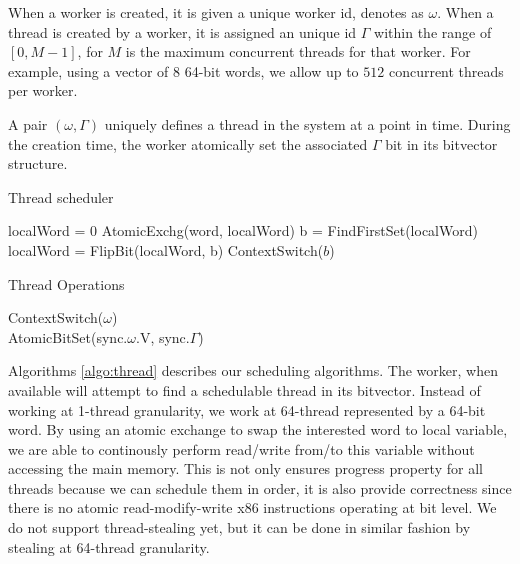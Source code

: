 \documentclass{sig-alternate-05-2015}
\begin{document}
When a worker is created, it is given a unique worker id, denotes as $\omega$.
When a thread is created by a worker, it is assigned an unique id $\Gamma$
within the range of $[0,M-1]$, for $M$ is the maximum concurrent threads for
that worker.  For example, using a vector of $8$ 64-bit words, we allow up to
$512$ concurrent threads per worker.

A pair $(\omega, \Gamma)$ uniquely defines a thread in the system at a point in
time. During the creation time, the worker atomically set the
associated $\Gamma$ bit in its bitvector structure.

\begin{algorithm}
  \caption{Thread scheduler}
  \label{algo:thread}
  \begin{algorithmic}[1]
     
     
        \State localWord = 0
        \State AtomicExchg(word, localWord)
          \State b = FindFirstSet(localWord)
          \State localWord = FlipBit(localWord, b)
          \State ContextSwitch($b$)
        \EndWhile
      \EndIf
      \EndFor
    \EndWhile
    \EndProcedure
  \end{algorithmic}
\end{algorithm}

\begin{algorithm}
  \caption{Thread Operations}
  \label{algo:thread-ops}
  \begin{algorithmic}[1]
      \State ContextSwitch($\omega$)
    \EndProcedure
    \\ 
      \State AtomicBitSet(sync.$\omega$.V, sync.$\Gamma$)
    \EndProcedure
  \end{algorithmic}
\end{algorithm}

Algorithms \ref{algo:thread} describes our scheduling algorithms. The
worker, when available will attempt to find a schedulable thread in its bitvector.
Instead of working at 1-thread granularity, we work
at 64-thread represented by a 64-bit word. By using an atomic exchange to swap
the interested word to local variable, we are able to continously perform
read/write from/to this variable without accessing the main memory.  This is
not only ensures progress property for all threads because we can schedule them
in order, it is also provide correctness since there is no atomic
read-modify-write x86 instructions operating at bit level.  We do not support
thread-stealing yet, but it can be done in similar fashion by stealing at 64-thread
granularity.
\end{document}
